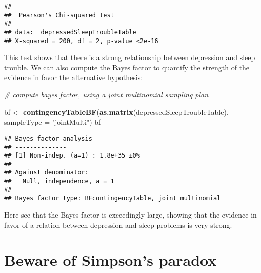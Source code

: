 \documentclass[]{book}
\newenvironment{Shaded}{\begin{snugshade}}{\end{snugshade}}
\newcommand{\KeywordTok}[1]{\textcolor[rgb]{0.13,0.29,0.53}{\textbf{#1}}}
\newcommand{\DataTypeTok}[1]{\textcolor[rgb]{0.13,0.29,0.53}{#1}}
\newcommand{\StringTok}[1]{\textcolor[rgb]{0.31,0.60,0.02}{#1}}
\newcommand{\CommentTok}[1]{\textcolor[rgb]{0.56,0.35,0.01}{\textit{#1}}}
\newcommand{\OperatorTok}[1]{\textcolor[rgb]{0.81,0.36,0.00}{\textbf{#1}}}
\newcommand{\NormalTok}[1]{#1}
\theoremstyle{definition}
\theoremstyle{definition}
\theoremstyle{definition}
\theoremstyle{remark}
\begin{document}
\begin{Shaded}
\end{Shaded}

\begin{verbatim}
## 
##  Pearson's Chi-squared test
## 
## data:  depressedSleepTroubleTable
## X-squared = 200, df = 2, p-value <2e-16
\end{verbatim}

This test shows that there is a strong relationship between depression
and sleep trouble. We can also compute the Bayes factor to quantify the
strength of the evidence in favor the alternative hypothesis:

\begin{Shaded}
\begin{Highlighting}[]
\CommentTok{# compute bayes factor, using a joint multinomial sampling plan}

\NormalTok{bf <-}\StringTok{ }\KeywordTok{contingencyTableBF}\NormalTok{(}\KeywordTok{as.matrix}\NormalTok{(depressedSleepTroubleTable), }
                         \DataTypeTok{sampleType =} \StringTok{"jointMulti"}\NormalTok{)}
\NormalTok{bf}
\end{Highlighting}
\end{Shaded}

\begin{verbatim}
## Bayes factor analysis
## --------------
## [1] Non-indep. (a=1) : 1.8e+35 ±0%
## 
## Against denominator:
##   Null, independence, a = 1 
## ---
## Bayes factor type: BFcontingencyTable, joint multinomial
\end{verbatim}

Here see that the Bayes factor is exceedingly large, showing that the
evidence in favor of a relation between depression and sleep problems is
very strong.

\section{Beware of Simpson's paradox}\label{beware-of-simpsons-paradox}
\end{document}
